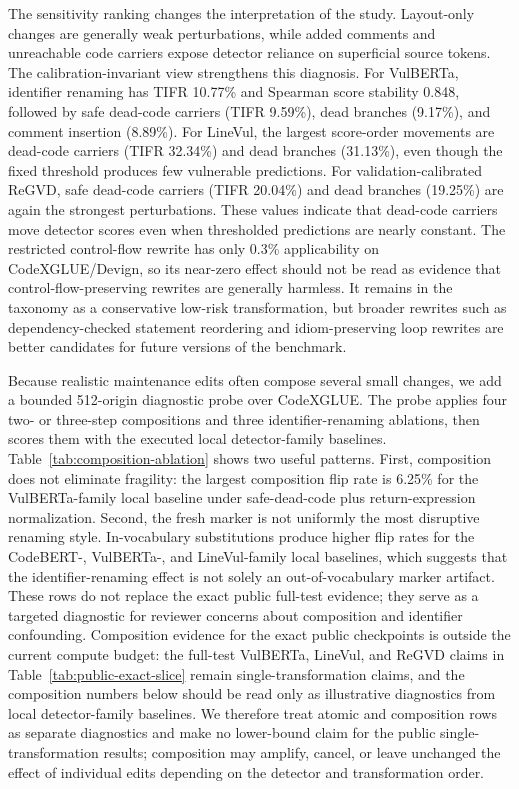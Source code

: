 \documentclass[a4paper,fleqn]{cas-dc}
\begin{document}
The sensitivity ranking changes the interpretation of the study. Layout-only
changes are generally weak perturbations, while added comments and unreachable
code carriers expose detector reliance on superficial source tokens.
The calibration-invariant view strengthens this diagnosis. For VulBERTa,
identifier renaming has TIFR 10.77\% and Spearman score stability 0.848,
followed by safe dead-code carriers (TIFR 9.59\%), dead branches (9.17\%), and
comment insertion (8.89\%). For LineVul, the largest score-order movements are
dead-code carriers (TIFR 32.34\%) and dead branches (31.13\%), even though the
fixed threshold produces few vulnerable predictions. For validation-calibrated
ReGVD, safe dead-code carriers (TIFR 20.04\%) and dead branches (19.25\%) are
again the strongest perturbations. These values indicate that dead-code
carriers move detector scores even when thresholded predictions are nearly
constant.
The restricted control-flow rewrite has only 0.3\% applicability on
CodeXGLUE/Devign, so its near-zero effect should not be read as evidence that
control-flow-preserving rewrites are generally harmless. It remains in the
taxonomy as a conservative low-risk transformation, but broader rewrites such
as dependency-checked statement reordering and idiom-preserving loop rewrites
are better candidates for future versions of the benchmark.

Because realistic maintenance edits often compose several small changes, we add
a bounded 512-origin diagnostic probe over CodeXGLUE. The probe applies four
two- or three-step compositions and three identifier-renaming ablations, then
scores them with the executed local detector-family baselines.
Table~\ref{tab:composition-ablation} shows two useful patterns. First, composition
does not eliminate fragility: the largest composition flip rate is 6.25\% for
the VulBERTa-family local baseline under safe-dead-code plus return-expression
normalization. Second, the fresh marker is not uniformly the most disruptive
renaming style. In-vocabulary substitutions produce higher flip rates for the
CodeBERT-, VulBERTa-, and LineVul-family local baselines, which suggests that
the identifier-renaming effect is not solely an out-of-vocabulary marker
artifact. These rows do not replace the exact public full-test evidence; they
serve as a targeted diagnostic for reviewer concerns about composition and
identifier confounding.
Composition evidence for the exact public checkpoints is outside the current
compute budget: the full-test VulBERTa, LineVul, and ReGVD claims in
Table~\ref{tab:public-exact-slice} remain single-transformation claims, and the
composition numbers below should be read only as illustrative diagnostics from
local detector-family baselines. We therefore treat atomic and composition rows
as separate diagnostics and make no lower-bound claim for the public
single-transformation results; composition may amplify, cancel, or leave
unchanged the effect of individual edits depending on the detector and
transformation order.
\end{document}
